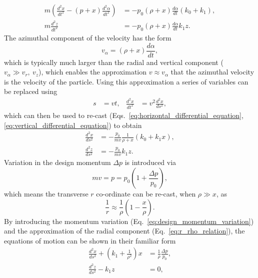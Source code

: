 \documentclass[../main.tex]{subfiles}
\begin{document}
\begin{align}
m\left(\frac{d^{2}x}{dt^{2}}-\left(p+x\right)\frac{d^{2}\alpha}{dt^{2}}\right) &=-p_{0}\left(\rho+x\right)\frac{d\alpha}{dt}\left(k_{0}+k_{1}\right), 
\label{eq:horizontal_differential_equation}\\   
m\frac{d^{2}z}{dt^{2}} &= -p_{0}\left(\rho+x\right)\frac{d\alpha}{dt}k_{1}z.
\label{eq:vertical_differential_equation}
\end{align}
The azimuthal component of the velocity has the form
\begin{equation}
v_{\alpha} = \left(\rho+x\right)\frac{d\alpha}{dt},
\label{eq:azimuthal_velocity}    
\end{equation}
which is typically much larger than the radial and vertical component ($v_{\alpha}\gg v_{r},~v_{z}$), which enables the approximation $v\approx v_{\alpha}$ that the azimuthal velocity is the velocity of the particle. Using this approximation a series of variables can be replaced using
\begin{align}
s&=vt, & \frac{d^{2}x}{dt^{2}} &= v^{2}\frac{d^{2}x}{ds^{2}},
\label{eq:velocity_approximation_replacing_variables}    
\end{align}
which can then be used to re-cast (Eqs.~\ref{eq:horizontal_differential_equation}, \ref{eq:vertical_differential_equation}) to obtain
\begin{align}
\frac{d^{2}x}{ds^{2}} &= -\frac{p_{0}}{mv}\frac{1}{\rho+x}\left(k_{0}+k_{1}x\right),
\label{eq:horizontal_recast_differential_equation} \\
\frac{d^{2}z}{ds^{2}} &= -\frac{p_{0}}{mv}k_{1}z.
\label{eq:vertical_recast_differential_equation}
\end{align}
Variation in the design momentum $\Delta p$ is introduced via
\begin{equation}
mv = p = p_{0}\left(1+\frac{\Delta p}{p_{0}}\right),
\label{eq:design_momentum_variation}    
\end{equation}
which means the transverse $r$ co-ordinate can be re-cast, when $\rho \gg x$, as
\begin{equation}
\frac{1}{r}\approx \frac{1}{\rho}\left(1-\frac{x}{\rho}\right). 
\label{eq:r_rho_relation}
\end{equation}
By introducing the momentum variation (Eq.~\ref{eq:design_momentum_variation}) and the approximation of the radial component (Eq.~\ref{eq:r_rho_relation}), the equations of motion can be shown in their familiar form \cite{rossbach1993basic,wille2000physics}
\begin{align}
\frac{d^{2}x}{ds^{2}} +\left(k_{1}+\frac{1}{\rho^{2}}\right)x &= \frac{1}{\rho}\frac{\Delta p}{p_{0}},
\label{eq:horizontal_equation_of_motion} \\
\frac{d^{2}z}{ds^{2}} - k_{1}z &= 0,
\label{eq:vertical_equation_of_motion}
\end{align}
\end{document}
